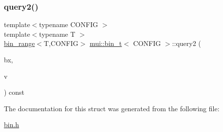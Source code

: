 \mbox{\label{structmui_1_1bin__t_abda7b56b8f16c788edef7ffa446945b9}} 
\subsubsection{\texorpdfstring{query2()}{query2()}}
{\footnotesize\ttfamily template$<$typename C\+O\+N\+F\+IG $>$ \\
template$<$typename T $>$ \\
\hyperlink{structmui_1_1bin__range}{bin\+\_\+range}$<$T,C\+O\+N\+F\+IG$>$ \hyperlink{structmui_1_1bin__t}{mui\+::bin\+\_\+t}$<$ C\+O\+N\+F\+IG $>$\+::query2 (\begin{DoxyParamCaption}\item[{const \hyperlink{classmui_1_1geometry_1_1box}{geometry\+::box}$<$ C\+O\+N\+F\+IG $>$ \&}]{bx,  }\item[{const std\+::vector$<$ std\+::pair$<$ point\+\_\+type, T $>$ $>$ \&}]{v }\end{DoxyParamCaption}) const\hspace{0.3cm}{\ttfamily [inline]}}



The documentation for this struct was generated from the following file\+:\begin{DoxyCompactItemize}
\item 
\hyperlink{bin_8h}{bin.\+h}\end{DoxyCompactItemize}
